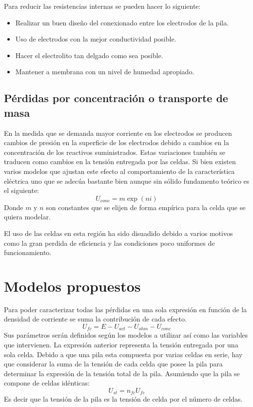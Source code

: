 Para reducir las resistencias internas se pueden hacer lo siguiente:
\begin{itemize}
 \item Realizar un buen diseño del conexionado entre los electrodos de la pila.
 \item Uso de electrodos con la mejor conductividad posible.
 \item Hacer el electrolito tan delgado como sea posible.
 \item Mantener a membrana con un nivel de humedad apropiado.
\end{itemize}

\subsection{Pérdidas por concentración o transporte de masa}
En la medida que se demanda mayor corriente en los electrodos se producen cambios de presión en la superficie de los electrodos
debido a cambios en la concentración de los reactivos suministrados.
Estas variaciones también se traducen como cambios en la tensión entregada por las celdas. Si bien existen varios modelos que
ajustan este efecto al comportamiento de la característica eléctrica uno que se adecúa bastante bien aunque sin sólido
fundamento teórico es el siguiente:
$$ U_{conc}=m\exp(ni) $$
Donde $m$ y $n$ son constantes que se elijen de forma empírica para la celda que se quiera modelar. 

El uso de las celdas en esta región ha sido disuadido debido a varios motivos como la gran perdida 
de eficiencia y las condiciones poco uniformes de funcionamiento.

\section{Modelos propuestos}
Para poder caracterizar todas las pérdidas en una sola expresión en función de la densidad de corriente se suma la contribución
de cada efecto.
\begin{equation}
 U_{fc}=E-U_{act}-U_{ohm}-U_{conc}
 \label{eq:tension_general}
\end{equation}
Sus parámetros serán definidos según los modelos a utilizar así como las variables que intervienen. La expresión anterior representa
la tensión entregada por una sola celda. Debido a que una pila esta compuesta por varias celdas en serie, hay que considerar la suma 
de la tensión de cada celda que posee la pila para determinar la expresión de la tensión total de la pila. Asumiendo que la pila se 
compone de celdas idénticas:
\begin{equation}
 U_{st}=n_{fc}U_{fc}
\end{equation}
Es decir que la tensión de la pila es la tensión de celda por el número de celdas.

